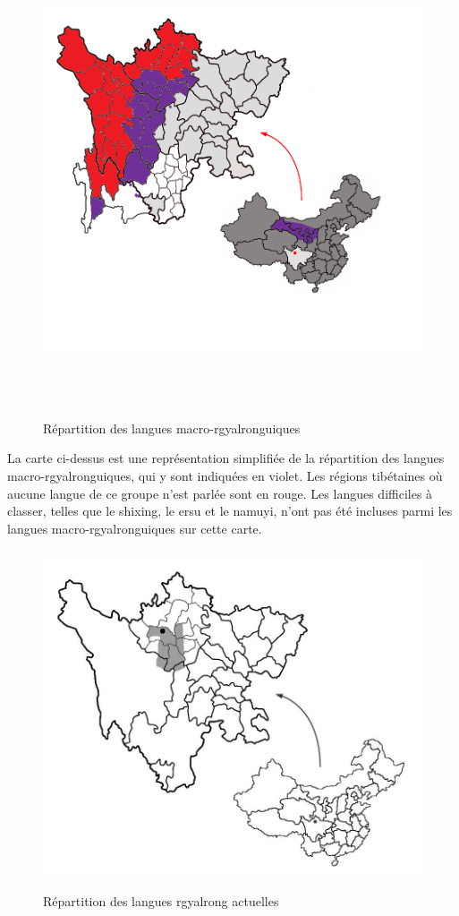 \documentclass[oldfontcommands,oneside,a4paper,11pt]{memoir}
\begin{document}
\begin{figure}[h]
\centering
\includegraphics[height=140mm]{qiangic.png}
\caption{Répartition des langues macro-rgyalronguiques}
\label{fig:qiangic}
\end{figure}
	La carte ci-dessus est une représentation simplifiée de la répartition des langues macro-rgyalronguiques, qui y sont indiquées en violet. Les régions tibétaines  où aucune langue de ce groupe n’est parlée sont en rouge. Les langues difficiles à classer, telles que le shixing, le ersu et le namuyi, n’ont pas été incluses parmi les langues macro-rgyalronguiques sur cette carte.
\begin{figure}[h]
\centering
\includegraphics[height=100mm]{carte.JPG}
\caption{Répartition des langues rgyalrong actuelles}
\label{fig:rgyalrong}
\end{figure}
\end{document}
